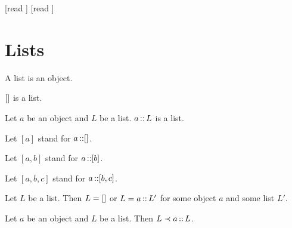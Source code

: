 \documentclass[10pt]{article}
\begin{document}
  \begin{imports}
    \begin{forthel}
      [read ]
      [read ]
    \end{forthel}
  \end{imports}


  \section*{Lists}

  \begin{forthel}
    \begin{signature}[id=LISTS_LISTS_4578620297183232,printid]
      A list is an object.
    \end{signature}
  \end{forthel}

  \begin{forthel}
    \begin{signature}[id=LISTS_LISTS_3703161885818880,printid]
      $[]$ is a list.
    \end{signature}
  \end{forthel}

  \begin{forthel}
    \begin{signature}[id=LISTS_LISTS_8050301789536256,printid]
      Let $a$ be an object and $L$ be a list.
      $a \mathop{::} L$ is a list.
    \end{signature}
  \end{forthel}

  \begin{forthel}
    Let $[a]$ stand for $a \mathop{::} []$.
    
    Let $[a,b]$ stand for $a \mathop{::} [b]$.
    
    Let $[a,b,c]$ stand for $a \mathop{::} [b,c]$.
  \end{forthel}

  \begin{forthel}
    \begin{axiom}[id=LISTS_LISTS_4512036658964875,printid]
      Let $L$ be a list.
      Then $L = []$ or $L = a \mathop{::} L'$ for some object $a$ and some list $L'$.
    \end{axiom}
  \end{forthel}

  \begin{forthel}
    \begin{axiom}[id=LISTS_LISTS_1021563255448756,printid]
      Let $a$ be an object and $L$ be a list.
      Then $L \prec a \mathop{::} L$.
    \end{axiom}
  \end{forthel}
\end{document}
